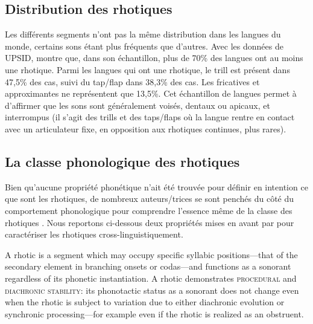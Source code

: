 \subsection{Distribution des rhotiques}

Les différents segments n'ont pas la même distribution dans les langues du monde, certains sons étant plus fréquents que d'autres. Avec les données de UPSID, \textcite{maddiesonPatternsSounds1984} montre que, dans son échantillon, plus de 70\% des langues ont au moins une rhotique. Parmi les langues qui ont une rhotique, le trill est présent dans 47,5\% des cas, suivi du tap/flap dans 38,3\% des cas. Les fricatives et approximantes ne représentent que 13,5\%. Cet échantillon de langues permet à \citeauthor{maddiesonPatternsSounds1984} d'affirmer que les sons  sont généralement voisés, dentaux ou apicaux, et interrompus (il s'agit des trills et des taps/flaps où la langue rentre en contact avec un articulateur fixe, en opposition aux rhotiques continues, plus rares).\\

\subsection{La classe phonologique des rhotiques}

Bien qu'aucune propriété phonétique n'ait été trouvée pour définir en intention ce que sont les rhotiques, de nombreux auteurs/trices se sont penchés du côté du comportement phonologique pour comprendre l'essence même de la classe des rhotiques \parencite{lindauStory1985,dickey1997phonology,magnusonStoryTwoVocal2007,chabotWhatWrongBeing2019}.
Nous reportons ci-dessous deux propriétés mises en avant par \textcite[11]{chabotWhatWrongBeing2019} pour caractériser les rhotiques cross-linguistiquement.

\begin{exe}
	\ex \begin{xlist}
		\ex A rhotic is a segment which may occupy specific syllabic positions—that of the secondary element in branching onsets or codas—and functions as a sonorant regardless of its phonetic instantiation.
		\ex A rhotic demonstrates \textsc{procedural} and \textsc{diachronic stability}: its phonotactic status as a sonorant does not change even when the rhotic is subject to variation due to either diachronic evolution or synchronic processing—for example even if the rhotic is realized as an obstruent.
	\end{xlist}
\end{exe}
\setcounter{exx}{0}

